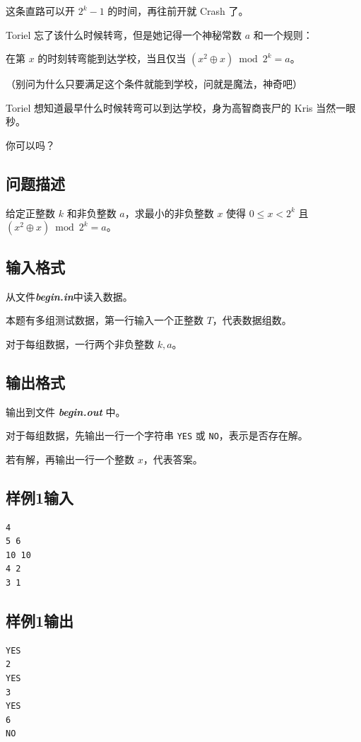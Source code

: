 \documentclass[12pt]{article}
\newcommand{\filename}[1]{{\textbf{\textit{#1}}}}
\begin{document}
这条直路可以开 $2^k-1$ 的时间，再往前开就 Crash 了。

Toriel 忘了该什么时候转弯，但是她记得一个神秘常数 $a$ 和一个规则：

在第 $x$ 的时刻转弯能到达学校，当且仅当 $(x^2\oplus x)\bmod{2^k}=a$。

（别问为什么只要满足这个条件就能到学校，问就是魔法，神奇吧）

Toriel 想知道最早什么时候转弯可以到达学校，身为高智商丧尸的 Kris 当然一眼秒。

你可以吗？

\subsection{问题描述}

给定正整数 $k$ 和非负整数 $a$，求最小的非负整数 $x$ 使得 $0\le x<2^k$ 且 $(x^2\oplus x)\bmod{2^k}=a$。

\subsection{输入格式}

从文件\filename{begin.in}中读入数据。

本题有多组测试数据，第一行输入一个正整数 $T$，代表数据组数。

对于每组数据，一行两个非负整数 $k,a$。

\subsection{输出格式}

输出到文件 \filename{begin.out} 中。

对于每组数据，先输出一行一个字符串 \texttt{YES} 或 \texttt{NO}，表示是否存在解。

若有解，再输出一行一个整数 $x$，代表答案。

\subsection{样例1输入}

\begin{lstlisting}
4
5 6
10 10
4 2
3 1
\end{lstlisting}

\subsection{样例1输出}

\begin{lstlisting}
YES
2
YES
3
YES
6
NO
\end{lstlisting}
\end{document}
